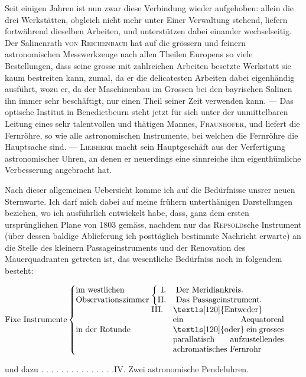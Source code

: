 Seit einigen Jahren ist nun zwar diese Verbindung wieder aufgehoben: allein die drei Werkstätten, obgleich nicht mehr unter Einer Verwaltung stehend, liefern fortwährend dieselben Arbeiten, und unterstützen dabei einander wechselseitig. Der Salinenrath \textsc{von Reichenbach} hat auf die grössern und feinern astronomischen Messwerkzeuge nach allen Theilen Europens so viele Bestellungen, dass seine grosse mit zahlreichen Arbeiten besetzte Werkstatt sie kaum bestreiten kann, zumal, da er die delicatesten Arbeiten dabei eigenhändig ausführt, wozu er, da der Maschinenbau im Grossen bei den bayrischen Salinen ihn immer sehr beschäftigt, nur einen Theil seiner Zeit verwenden kann. — Das optische Institut in Benedictbeurn steht jetzt für sich unter der unmittelbaren Leitung eines sehr talentvollen und thätigen Mannes, \textsc{Fraunhofer}, und liefert die Fernröhre, so wie alle astronomischen Instrumente, bei welchen die Fernröhre die Hauptsache sind. — \textsc{Liebherr} macht sein Hauptgeschäft aus der Verfertigung astronomischer Uhren, an denen er neuerdings eine sinnreiche ihm eigenthümliche Verbesserung angebracht hat.

Nach dieser allgemeinen Uebersicht komme ich auf die Bedürfnisse unsrer neuen Sternwarte. Ich darf mich dabei auf meine frühern unterthänigen Darstellungen beziehen, wo ich ausführlich entwickelt habe, dass, ganz dem ersten ursprünglichen Plane von 1803 gemäss, nachdem nur das \textsc{Repsold}sche Instrument (über dessen baldige Ablieferung ich posttäglich bestimmte Nachricht
\clearpage{}\HistoricalFoot{}{39\textsuperscript{*}}
\noindent erwarte) an die Stelle des kleinern Passageinstruments und der Renovation des Mauerquadranten getreten ist, das wesentliche Bedürfniss noch in folgendem besteht:
\begin{center}\begingroup\fontsize{9.5}{12}\selectfont
\(\text{Fixe Instrumente}\left\{\begin{array}{@{}l@{\;}l@{}}
\begin{tabular}{@{}l@{}}im westlichen\\Observationszimmer\end{tabular}&\left\{\begin{tabular}{@{}rl@{}}I.&Der Meridiankreis.\\II.&Das Passageinstrument.\end{tabular}\right.\\[3pt]
\text{in der Rotunde}&\begin{tabular}{@{}rp{.39\textwidth}@{}}III.&\textls[120]{Entweder} ein Aequatoreal \textls[120]{oder} ein grosses parallatisch aufzustellendes achromatisches Fernrohr\end{tabular}
\end{array}\right.\)\par\smallskip
und dazu . . . . . . . . . . . . . . .\quad IV. Zwei astronomische Pendeluhren.
\par\endgroup\end{center}

